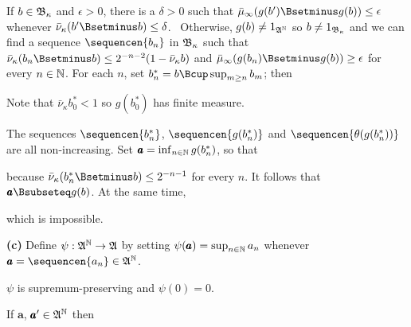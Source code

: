 {\medskip

 If
$b\in\frak B_{\kappa}$ and $\epsilon>0$, there is a $\delta>0$ such
that $\bar\mu_{\infty}(g(b')\Bsetminus g(b))\le\epsilon$ whenever
$\bar\nu_{\kappa}(b'\Bsetminus b)\le\delta$.   \Prf\Quer\
Otherwise, $g(b)\ne 1_{\frak A^{\Bbb N}}$ so $b\ne 1_{\frak B_{\kappa}}$
and we can find a sequence $\sequencen{b_n}$ in $\frak B_{\kappa}$
such that
$\bar\nu_{\kappa}(b_n\Bsetminus b)\le 2^{-n-2}(1-\bar\nu_{\kappa}b)$ and
$\bar\mu_{\infty}(g(b_n)\Bsetminus g(b))\ge\epsilon$ for every
$n\in\Bbb N$.   For each $n$, set
$b^*_n=b\Bcup\sup_{m\ge n}b_m$;  then


\noindent Note that $\bar\nu_{\kappa}b^*_0<1$ so $g(b^*_0)$ has finite
measure.

The sequences $\sequencen{b^*_n}$,
$\sequencen{g(b^*_n)}$ and $\sequencen{\theta(g(b^*_n))}$
are all non-increasing.   Set $\pmb{a}=\inf_{n\in\Bbb N}g(b^*_n)$, so that


\noindent because $\bar\nu_{\kappa}(b^*_n\Bsetminus b)\le 2^{-n-1}$ for
every $n$.   It follows that $\pmb{a}\Bsubseteq g(b)$.   At the same time,


\noindent which is impossible.\ \Bang\Qed

\medskip

{\bf (c)} Define $\psi:\frak A^{\Bbb N}\to\frak A$ by setting
$\psi(\pmb{a})=\sup_{n\in\Bbb N}a_n$ whenever
$\pmb{a}=\sequencen{a_n}\in\frak A^{\Bbb N}$.

\medskip

 $\psi$ is supremum-preserving and $\psi(0)=0$.

\medskip

 If $\pmb{a}$, $\pmb{a}'\in\frak A^{\Bbb N}$ then


}

